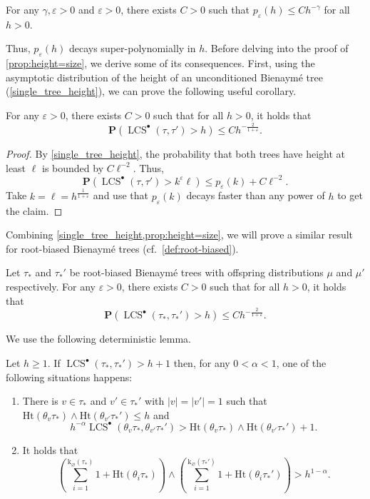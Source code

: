 \documentclass[11pt,reqno]{amsart}
\renewcommand{\P}{\mathbf{P}}
\newcommand{\1}{\mathbf{1}}
\newcommand{\0}{\mathbf{0}}
\newcommand{\e}{\varepsilon}
\newcommand{\prob}{\mathbf{P}}
\newcommand{\Ht}{\mathrm{Ht}}
\newcommand{\rk}{\mathrm{k}}
\newcommand{\LCS}{\operatorname{LCS}}
\newcommand{\eps}{\varepsilon}
\begin{document}
\begin{prop}\label{prop:height=size}
  For any $\gamma,\eps > 0$ and $\eps > 0$, there exists $C > 0$ such that $p_\eps(h) \leq Ch^{-\gamma}$ for all $h > 0$.
\end{prop}

Thus, $p_\eps(h)$ decays super-polynomially in $h$.
Before delving into the proof of \cref{prop:height=size}, we derive some of its consequences.
First, using the asymptotic distribution of the height of an unconditioned Bienaym\'{e} tree (\cref{single_tree_height}), we can prove the following useful corollary.

\begin{cor}\label{cor:LCS-tail}
  For any $\eps > 0$, there exists $C > 0$ such that for all $h>0$, it holds that 
  \[
    \P(\LCS^\bullet(\tau,\tau') > h) \leq C h^{-\frac{2}{1+\e}}.
  \]
\end{cor}

\begin{proof}
  By \cref{single_tree_height}, the probability that both trees have height at least $\ell$ is bounded by $C\ell^{-2}$.
  Thus,
  \[
    \P(\LCS^\bullet(\tau,\tau') > k^\eps \ell) \leq p_\eps(k) + C\ell^{-2}.
  \]
  Take $k=\ell=h^{\frac{1}{1+\eps}}$ and use that $p_\eps(k)$ decays faster than any power of $h$ to get the claim.
\end{proof}

Combining \cref{single_tree_height,prop:height=size}, we will prove a similar result for root-biased Bienaym\'{e} trees (cf.~\cref{def:root-biased}).

\begin{prop}\label{prop:LCS_sb_tail}
  Let $\tau_*$ and $\tau_*'$ be root-biased Bienaym\'{e} trees with offspring distributions $\mu$ and $\mu'$ respectively. For any $\eps>0$, there exists $C>0$ such that for all $h>0$, it holds that 
  \[
    \prob(\LCS^\bullet(\tau_*,\tau_*') > h) \leq C h^{-\frac{2}{1+\e}}.
  \]
\end{prop}

We use the following deterministic lemma. 

\begin{lem}\label{lem:cases_sb}
    Let $h\geq 1$. If $\LCS^\bullet(\tau_*,\tau_*') > h+1$ then, for any $0<\alpha<1$, one of the following situations happens: 
    \begin{enumerate}
        \item[\emph{(i)}] There is $v\in \tau_*$ and $v'\in \tau_*'$ with $|v|=|v'|=1$ such that $\Ht(\theta_v\tau_*)\wedge \Ht(\theta_{v'}\tau_*')\le h$ and \[h^{-\alpha}\LCS^\bullet(\theta_v\tau_*,\theta_{v'}\tau_*')> \Ht(\theta_v\tau_*)\wedge \Ht(\theta_{v'}\tau_*') +1.\] 
        \item[\emph{(ii)}] It holds that 
        \[\left(\sum_{i=1}^{\rk_\varnothing(\tau_*)}1+\Ht(\theta_i\tau_*)\right)\wedge \left(\sum_{i=1}^{\rk_\varnothing(\tau_*')}1+\Ht(\theta_i\tau_*')\right)>h^{1-\alpha}.\]
    \end{enumerate}
\end{lem}
\end{document}

